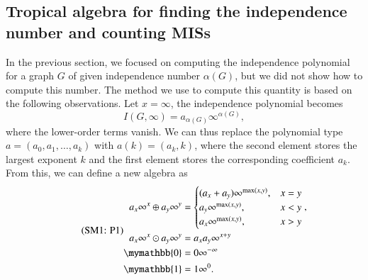 \documentclass[onefignum, onetabnum]{siamart190516}
\newcommand{\eqname}[1]{\stepcounter{equation}\tag{\theequation : #1}}
\newcommand{\<}{\langle}
\renewcommand{\>}{\rangle}
\begin{document}
\subsection{Tropical algebra for finding the independence number and counting MISs}
In the previous section, we focused on computing the independence polynomial for a graph $G$ of given independence number $\alpha(G)$, but we did not show how to compute this number.
The method we use to compute this quantity is based on the following observations. Let $x=\infty$, the independence polynomial becomes
\begin{equation}
I(G, \infty) = a_{\alpha(G)} \infty^{\alpha(G)},
\end{equation}
where the lower-order terms vanish. We can thus replace the polynomial type $a = (a_0, a_1, \ldots, a_k)$ with $a(k) = (a_{k}, k)$, where the second element stores the largest exponent $k$ and the first element stores the corresponding coefficient $a_{k}$.
From this, we can define a new algebra as
\begin{equation}
    \eqname{P1}
\begin{split}
    a_x\infty^x \oplus a_y\infty^y &= \begin{cases}
        (a_x + a_y)\infty^{\max(x,y)}, & x = y\\
        a_y\infty^{\max(x,y)}, & x < y\\
        a_x\infty^{\max(x,y)}, & x > y
    \end{cases}, \\
    a_x\infty^x \odot a_y\infty^y &= a_x a_y\infty^{x+y}\\
    \mymathbb{0} &= 0\infty^{-\infty}\\
    \mymathbb{1} &= 1\infty^{0}.
\end{split}%
\label{eq:countingtropical}
\end{equation}
\end{document}
